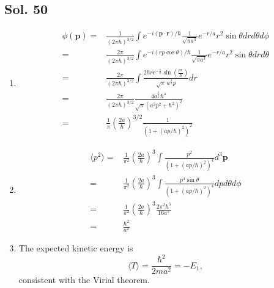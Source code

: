         \subsection*{Sol. 50}
        \begin{enumerate}
            \item 
            \begin{align*}
                \phi(\bm p)
                =&\frac{1}{(2\pi\hbar)^{3/2}}\int
                e^{-i(\bm p\cdot \bm r)/\hbar}
                \frac{1}{\sqrt{\pi a^3}}
                e^{-r/a}
                r^2\sin\theta drd\theta d\phi\\
                =&
                \frac{2\pi}{(2\pi\hbar)^{3/2}}\int
                e^{-i(rp\cos\theta)/\hbar}
                \frac{1}{\sqrt{\pi a^3}}
                e^{-r/a}
                r^2\sin\theta
                drd\theta \\
                =&
                \frac{2\pi}{(2\pi\hbar)^{3/2}}
                \int \frac{2hr\mathrm{e}^{-\frac{r}{a}} \sin\left(\frac{pr}{\hbar}\right)}{\sqrt{\pi} \, a^{\frac{3}{2}} p} dr\\
                =&
                \frac{2\pi}{(2\pi\hbar)^{3/2}}
                \frac{4a^{\frac{3}{2}} \hbar^{4}}{\sqrt{\pi} \left(a^{2} p^{2} + \hbar^{2}\right)^{2}}\\
                =&
                \frac{1}{\pi}\left(\frac{2a}{\hbar}\right)^{3/2}
                \frac{1}{(1+(ap/\hbar)^2)^2}
            \end{align*}
            \item 
            \begin{align*}
                \langle p^2\rangle
                = &
                \frac{1}{\pi^2}\left(\frac{2a}{\hbar}\right)^{3}\int
                \frac{p^2}{(1+(ap/\hbar)^2)^4}
                d^3\bm p\\
                =&  \frac{1}{\pi^2}\left(\frac{2a}{\hbar}\right)^{3}\int
                \frac{p^4\sin\theta}{(1+(ap/\hbar)^2)^4}
                dpd\theta d\phi\\
                =&
                \frac{1}{\pi^2}\left(\frac{2a}{\hbar}\right)^{3}\frac{2\pi^2 \hbar^{5}}{16a^{5}}\\
                =&\frac{\hbar^2}{a^2}
            \end{align*}
            \item The expected kinetic energy is $$
            \langle T\rangle = \frac{\hbar^2}{2ma^2}=-E_1,
            $$
            consistent with the Virial theorem.
            
        \end{enumerate}

